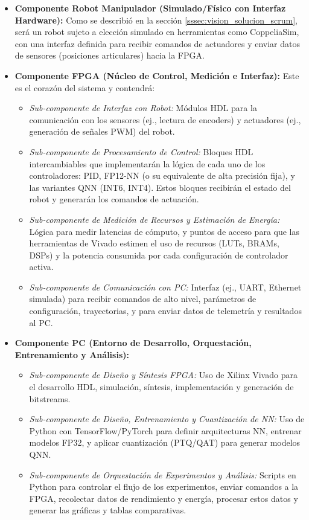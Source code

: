 \documentclass[12pt]{article}
\begin{document}
\begin{itemize}
    \item \textbf{Componente Robot Manipulador (Simulado/Físico con Interfaz Hardware):} Como se describió en la sección \ref{sssec:vision_solucion_scrum}, será un robot sujeto a elección simulado en herramientas como CoppeliaSim, con una interfaz definida para recibir comandos de actuadores y enviar datos de sensores (posiciones articulares) hacia la FPGA.
    \item \textbf{Componente FPGA (Núcleo de Control, Medición e Interfaz):} Este es el corazón del sistema y contendrá:
        \begin{itemize}
            \item \textit{Sub-componente de Interfaz con Robot:} Módulos HDL para la comunicación con los sensores (ej., lectura de encoders) y actuadores (ej., generación de señales PWM) del robot.
            \item \textit{Sub-componente de Procesamiento de Control:} Bloques HDL intercambiables que implementarán la lógica de cada uno de los controladores: PID, FP12-NN (o su equivalente de alta precisión fija), y las variantes QNN (INT6, INT4). Estos bloques recibirán el estado del robot y generarán los comandos de actuación.
            \item \textit{Sub-componente de Medición de Recursos y Estimación de Energía:} Lógica para medir latencias de cómputo, y puntos de acceso para que las herramientas de Vivado estimen el uso de recursos (LUTs, BRAMs, DSPs) y la potencia consumida por cada configuración de controlador activa.
            \item \textit{Sub-componente de Comunicación con PC:} Interfaz (ej., UART, Ethernet simulada) para recibir comandos de alto nivel, parámetros de configuración, trayectorias, y para enviar datos de telemetría y resultados al PC.
        \end{itemize}
    \item \textbf{Componente PC (Entorno de Desarrollo, Orquestación, Entrenamiento y Análisis):}
        \begin{itemize}
            \item \textit{Sub-componente de Diseño y Síntesis FPGA:} Uso de Xilinx Vivado para el desarrollo HDL, simulación, síntesis, implementación y generación de bitstreams.
            \item \textit{Sub-componente de Diseño, Entrenamiento y Cuantización de NN:} Uso de Python con TensorFlow/PyTorch para definir arquitecturas NN, entrenar modelos FP32, y aplicar cuantización (PTQ/QAT) para generar modelos QNN.
            \item \textit{Sub-componente de Orquestación de Experimentos y Análisis:} Scripts en Python para controlar el flujo de los experimentos, enviar comandos a la FPGA, recolectar datos de rendimiento y energía, procesar estos datos y generar las gráficas y tablas comparativas.
        \end{itemize}
\end{itemize}
\end{document}
